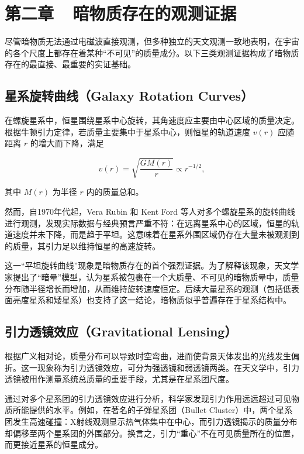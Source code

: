 \section*{第二章~~暗物质存在的观测证据}
\setcounter{section}{2} \setcounter{subsection}{0}
\setcounter{table}{0} \setcounter{figure}{0} \setcounter{equation}{0}

尽管暗物质无法通过电磁波直接观测，但多种独立的天文观测一致地表明，在宇宙的各个尺度上都存在着某种“不可见”的质量成分。以下三类观测证据构成了暗物质存在的最直接、最重要的实证基础。

\subsection{星系旋转曲线（Galaxy Rotation Curves）}

在螺旋星系中，恒星围绕星系中心旋转，其角速度应主要由中心区域的质量决定。根据牛顿引力定律，若质量主要集中于星系中心，则恒星的轨道速度 $v(r) $ 应随距离 $r$ 的增大而下降，满足

$$
v(r)
=\sqrt{\frac{G M(r) }{r } }
\propto r^{-1/2},
$$

其中 $M(r) $ 为半径 $r$ 内的质量总和。

然而，自1970年代起，Vera Rubin 和 Kent Ford 等人对多个螺旋星系的旋转曲线进行观测，发现实际数据与经典预言严重不符：在远离星系中心的区域，恒星的轨道速度并未下降，而是趋于平坦。这意味着在星系外围区域仍存在大量未被观测到的质量，其引力足以维持恒星的高速旋转。

这一“平坦旋转曲线”现象是暗物质存在的首个强烈证据。为了解释该现象，天文学家提出了“暗晕”模型，认为星系被包裹在一个大质量、不可见的暗物质晕中，质量分布随半径增长而增加，从而维持旋转速度恒定。后续大量星系的观测（包括低表面亮度星系和矮星系）也支持了这一结论，暗物质似乎普遍存在于星系结构中。

\subsection{引力透镜效应（Gravitational Lensing）}

根据广义相对论，质量分布可以导致时空弯曲，进而使背景天体发出的光线发生偏折。这一现象称为引力透镜效应，可分为强透镜和弱透镜两类。在天文学中，引力透镜被用作测量系统总质量的重要手段，尤其是在星系团尺度。

通过对多个星系团的引力透镜效应进行分析，科学家发现引力作用远远超过可见物质所能提供的水平。例如，在著名的子弹星系团（Bullet Cluster）中，两个星系团发生高速碰撞：X射线观测显示热气体集中在中心，而引力透镜揭示的质量分布却偏移至两个星系团的外围部分。换言之，引力“重心”不在可见质量所在的位置，而更接近星系的恒星成分。

